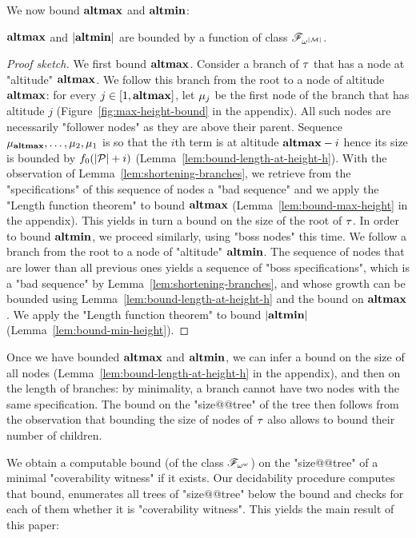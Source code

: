 We now bound $\mathbf{altmax}$ and $\mathbf{altmin}$:
\begin{lemma}
$\mathbf{altmax}$ and $|\mathbf{altmin}|$ are bounded by a function of class $\mathscr{F}_{\omega^{|\mathcal{M}|}}$. 
\end{lemma}
\begin{proof}[Proof sketch]
We first bound $\mathbf{altmax}$. Consider a branch of $\tau$ that has a node at "altitude" $\mathbf{altmax}$. We follow this branch from the root to a node of altitude $\mathbf{altmax}$: for every $j \in [1,\mathbf{altmax}]$, let $\mu_{j}$ be the first node of the branch that has altitude $j$ (Figure~\ref{fig:max-height-bound} in the appendix). All such nodes are necessarily "follower nodes" as they are above their parent. Sequence $\mu_{\mathbf{altmax}}, \dots, \mu_2, \mu_1$ is so that the $i$th term is at altitude $\mathbf{altmax}-i$ hence its size is bounded by $f_0(|\mathcal{P}| + i)$ (Lemma~\ref{lem:bound-length-at-height-h}). With the observation of Lemma~\ref{lem:shortening-branches}, we retrieve from the "specifications" of this sequence of nodes a "bad sequence" and we apply the "Length function theorem" to bound $\mathbf{altmax}$ (Lemma~\ref{lem:bound-max-height} in the appendix).
This yields in turn a bound on the size of the root of $\tau$. In order to bound $\mathbf{altmin}$, we proceed similarly, using "boss nodes" this time. We follow a branch from the root to a node of "altitude" $\mathbf{altmin}$. The sequence of nodes that are lower than all previous ones yields a sequence of "boss specifications", which is a "bad sequence" by Lemma~\ref{lem:shortening-branches}, and whose growth can be bounded using Lemma~\ref{lem:bound-length-at-height-h} and the bound on $\mathbf{altmax}$. We apply the "Length function theorem" to bound $|\mathbf{altmin}|$ (Lemma~\ref{lem:bound-min-height}).
\end{proof}

Once we have bounded $\mathbf{altmax}$ and $\mathbf{altmin}$, we can infer a bound on the size of all nodes (Lemma~\ref{lem:bound-length-at-height-h} in the appendix), and then on the length of branches: by minimality, a branch cannot have two nodes with the same specification. 
The bound on the "size@@tree" of the tree then follows from the observation that bounding the size of nodes of $\tau$ also allows to bound their number of children.
 



We obtain a computable bound (of the class $\mathscr{F}_{\omega^\omega}$) on the "size@@tree" of a minimal "coverability witness" if it exists. 
Our decidability procedure computes that bound, enumerates all trees of "size@@tree" below the bound and checks for each of them whether it is "coverability witness". This yields the main result of this paper:

\decidablecover*


